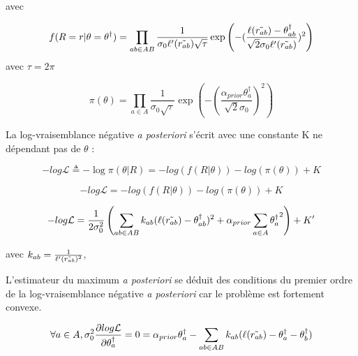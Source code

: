 avec

\begin{equation}
 f(R=r|\theta=\theta^\dagger)= \prod_{ab \in AB} \frac{1}{\sigma_0\ell'(\Tilde{r_{ab}})\sqrt{\tau}}\exp \left( -(\frac{\ell(\Tilde{r_{ab}})-\theta_{ab}^\dagger}{\sqrt{2}\sigma_0\ell'(\Tilde{r_{ab}})})^2 \right)    
\end{equation}
  avec  $\tau=2\pi$

\begin{equation}
 \pi(\theta)= \prod_{a \in A} \frac{1}{\sigma_0\sqrt{\tau}}\exp \left( -(\frac{\alpha_{prior}\theta^\dagger_a}{\sqrt{2}\sigma_0})^2 \right)    
\end{equation}


La log-vraisemblance négative \textit{a posteriori} s'écrit avec une constante K ne dépendant pas de $\theta$ :

\begin{equation}
 -log \mathcal{L} \triangleq -\log{\pi(\theta|R)} = -log(f(R|\theta))  -log(\pi(\theta))+ K     
\end{equation}


\begin{equation}
 -log \mathcal{L} = - log(f(R|\theta)) - log(\pi(\theta))+ K     
\end{equation}

\begin{equation}
 -log \mathcal{L} = \frac{1}{2\sigma_0^2} \left( \sum_{ab \in AB} k_{ab}(\ell(\Tilde{r_{ab}})-\theta_{ab}^\dagger)^2 + \alpha_{prior}\sum_{a \in A}{\theta^\dagger_a}^2 \right) + K'     
\end{equation}

avec $k_{ab} = \frac{1}{\ell'(\Tilde{r_{ab}})^2}$,

L'estimateur du maximum \textit{a posteriori} se déduit des conditions du premier ordre de la log-vraisemblance négative \textit{a posteriori} car le problème est fortement convexe.

\begin{equation}\label{equation:cpo}
\forall a \in A, \sigma_0^2\frac{\partial{log\mathcal{L}}}{\partial{\theta_a^\dagger}} = 0 = \alpha_{prior}\theta^\dagger_a - \sum_{ab \in AB}k_{ab}(\ell(\Tilde{r_{ab}})-\theta_{a}^\dagger-\theta_{b}^\dagger)
\end{equation}

